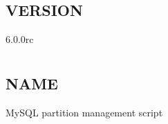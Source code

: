\documentclass[letterpaper,10pt,english]{sphinxmanual}
\begin{document}
\section{VERSION}
\label{\detokenize{mariadb-kill:version}}
 6.0.0rc


\chapter{}
\label{\detokenize{mariadb-parted:mariadb-parted}}\label{\detokenize{mariadb-parted::doc}}

\section{NAME}
\label{\detokenize{mariadb-parted:name}}
 \sphinxhyphen{} MySQL partition management script
\end{document}
